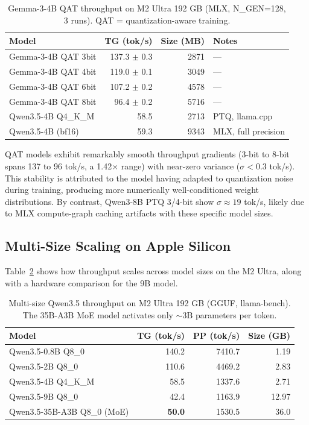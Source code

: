 \documentclass[11pt,a4paper]{article}
\begin{document}
\begin{table}[h]
\centering
\caption{Gemma-3-4B QAT throughput on M2 Ultra 192 GB (MLX, N\_GEN=128, 3 runs).
QAT = quantization-aware training.}
\label{tab:qat}
\begin{tabular}{lrrl}
\toprule
\textbf{Model} & \textbf{TG (tok/s)} & \textbf{Size (MB)} & \textbf{Notes} \\
\midrule
Gemma-3-4B QAT 3bit & 137.3 $\pm$ 0.3 & 2871 & --- \\
Gemma-3-4B QAT 4bit & 119.0 $\pm$ 0.1 & 3049 & --- \\
Gemma-3-4B QAT 6bit & 107.2 $\pm$ 0.2 & 4578 & --- \\
Gemma-3-4B QAT 8bit &  96.4 $\pm$ 0.2 & 5716 & --- \\
\midrule
Qwen3.5-4B Q4\_K\_M & 58.5  & 2713 & PTQ, llama.cpp \\
Qwen3.5-4B (bf16)   & 59.3  & 9343 & MLX, full precision \\
\bottomrule
\end{tabular}
\end{table}

QAT models exhibit remarkably smooth throughput gradients (3-bit to 8-bit spans
137 to 96 tok/s, a 1.42$\times$ range) with near-zero variance ($\sigma < 0.3$
tok/s).
This stability is attributed to the model having adapted to quantization noise
during training, producing more numerically well-conditioned weight distributions.
By contrast, Qwen3-8B PTQ 3/4-bit show $\sigma \approx 19$ tok/s, likely due to
MLX compute-graph caching artifacts with these specific model sizes.

\subsection{Multi-Size Scaling on Apple Silicon}

Table~\ref{tab:multisize} shows how throughput scales across model sizes on the
M2 Ultra, along with a hardware comparison for the 9B model.

\begin{table}[h]
\centering
\caption{Multi-size Qwen3.5 throughput on M2 Ultra 192 GB (GGUF, llama-bench).
The 35B-A3B MoE model activates only $\sim$3B parameters per token.}
\label{tab:multisize}
\begin{tabular}{lrrr}
\toprule
\textbf{Model} & \textbf{TG (tok/s)} & \textbf{PP (tok/s)} & \textbf{Size (GB)} \\
\midrule
Qwen3.5-0.8B Q8\_0             & 140.2 &  7410.7 & 1.19 \\
Qwen3.5-2B Q8\_0               & 110.6 &  4469.2 & 2.83 \\
Qwen3.5-4B Q4\_K\_M            &  58.5 &  1337.6 & 2.71 \\
Qwen3.5-9B Q8\_0               &  42.4 &  1163.9 & 12.97 \\
Qwen3.5-35B-A3B Q8\_0 (MoE)   & \textbf{50.0} & 1530.5 & 36.0 \\
\bottomrule
\end{tabular}
\end{table}
\end{document}
